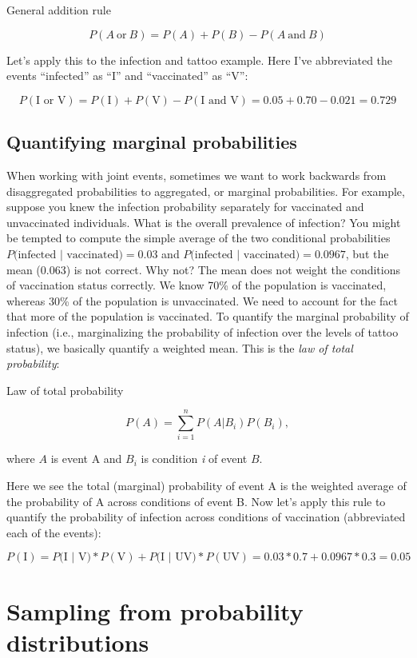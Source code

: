 \documentclass[
]{book}
\begin{document}
General addition rule

\[
P(A\ \text{or}\ B) = P(A) + P(B) - P(A\ \text{and}\ B)
\]

Let's apply this to the infection and tattoo example. Here I've abbreviated the events ``infected'' as ``I'' and ``vaccinated'' as ``V'':

\[
P(\text{I or V}) = P(\text{I}) + P(\text{V}) -P(\text{I and V})=0.05+0.70-0.021=0.729
\]

\subsection{Quantifying marginal probabilities}\label{quantifying-marginal-probabilities}

When working with joint events, sometimes we want to work backwards from disaggregated probabilities to aggregated, or marginal probabilities. For example, suppose you knew the infection probability separately for vaccinated and unvaccinated individuals. What is the overall prevalence of infection? You might be tempted to compute the simple average of the two conditional probabilities \(P(\text{infected | vaccinated)} = 0.03\) and \(P(\text{infected | vaccinated)} = 0.0967\), but the mean (0.063) is not correct. Why not? The mean does not weight the conditions of vaccination status correctly. We know 70\% of the population is vaccinated, whereas 30\% of the population is unvaccinated. We need to account for the fact that more of the population is vaccinated. To quantify the marginal probability of infection (i.e., marginalizing the probability of infection over the levels of tattoo status), we basically quantify a weighted mean. This is the \emph{law of total probability}:

Law of total probability

\[
P(A) = \sum_{i=1}^n P(A|B_i)P(B_i),
\]

where \(A\) is event A and \(B_i\) is condition \emph{i} of event \(B\).

Here we see the total (marginal) probability of event A is the weighted average of the probability of A across conditions of event B. Now let's apply this rule to quantify the probability of infection across conditions of vaccination (abbreviated each of the events):

\[
P(\text{I}) = P(\text{I | V)}*P(\text{V}) + P(\text{I | UV)}*P(\text{UV})=0.03*0.7+0.0967*0.3=0.05
\]

\section{Sampling from probability distributions}\label{sampling-from-probability-distributions}
\end{document}
